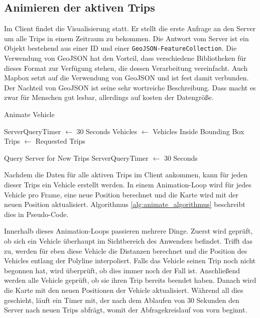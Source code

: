 \subsection{Animieren der aktiven Trips}
\label{sub:animieren_der_aktiven_trips}
  Im Client findet die Visualisierung statt. Er stellt die erste Anfrage an den Server um alle Trips in einem Zeitraum zu bekommen. Die Antwort vom Server ist ein Objekt bestehend aus einer ID und einer \texttt{GeoJSON-FeatureCollection}. Die Verwendung von GeoJSON hat den Vorteil, dass verschiedene Bibliotheken für dieses Format zur Verfügung stehen, die dessen Verarbeitung vereinfacht. Auch Mapbox setzt auf die Verwendung von GeoJSON und ist fest damit verbunden. Der Nachteil von GeoJSON ist seine sehr wortreiche Beschreibung. Dass macht es zwar für Menschen gut lesbar, allerdings auf kosten der Datengröße.

  \begin{algorithm}[H]
    \caption{Animate Vehicle}\label{alg:animate_algorithmus}
    \begin{algorithmic}[1]
        \State ServerQueryTimer $\gets$ 30 Seconds
        \State Vehicles $\gets$ Vehicles Inside Bounding Box
        \State Trips $\gets$ Requested Trips
           \EndFor

            \State Query Server for New Trips
            \State ServerQueryTimer $\gets$ 30 Seconds
          \EndIf

          \State {}
        \EndFunction
    \end{algorithmic}
  \end{algorithm}

  Nachdem die Daten für alle aktiven Trips im Client ankommen, kann für jeden dieser Trips ein Vehicle erstellt werden. In einem Animation-Loop wird für jedes Vehicle pro Frame, eine neue Position berechnet und die Karte wird mit der neuen Position aktualisiert. Algorithmus \ref{alg:animate_algorithmus} beschreibt dies in Pseudo-Code.

  Innerhalb dieses Animation-Loops passieren mehrere Dinge. Zuerst wird geprüft, ob sich ein Vehicle überhaupt im Sichtbereich des Anwenders befindet. Trifft das zu, werden für eben diese Vehicle die Distanzen berechnet und die Position des Vehicles entlang der Polyline interpoliert. Falls das Vehicle seinen Trip noch nicht begonnen hat, wird überprüft, ob dies immer noch der Fall ist. Anschließend werden alle Vehicle geprüft, ob sie ihren Trip bereits beendet haben. Danach wird die Karte mit den neuen Positionen der Vehicle aktualisiert. Während all dies geschieht, läuft ein Timer mit, der nach dem Ablaufen von 30 Sekunden den Server nach neuen Trips abfrägt, womit der Abfragekreislauf von vorn beginnt.

